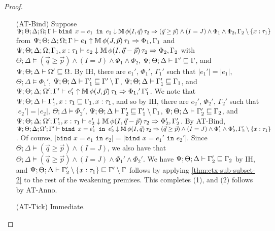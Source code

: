 \begin{proof}
\begin{itemize}
  \item[(AT-Bind)] Suppose
  $\Psi ; \Theta ; \Delta ; \Omega ; \Gamma \vdash \texttt{bind } x = e_1 \texttt{ in } e_2 \downarrow \mathbb{M} \, \phi(I,\vec{q})\, \tau_2 \Rightarrow (\vec{q} \geq \vec{p}) \wedge (I =J)  \wedge \Phi_1 \wedge \Phi_2, \Gamma_2 \setminus \{x : \tau_1\}$ from
  $\Psi ; \Theta ; \Delta ; \Omega ; \Gamma \vdash e_1 \uparrow \mathbb{M} \, \phi(J,\vec{p})\, \tau_1 \Rightarrow \Phi_1,\Gamma_1$ and
  $\Psi ; \Theta; \Delta ; \Omega ; \Gamma_1, x:\tau_1 \vdash e_2 \downarrow \mathbb{M} \, \phi(I,\vec{q} - \vec{p})\, \tau_2 \Rightarrow \Phi_2,\Gamma_2$ with
  $\Theta ; \Delta \vDash (\vec{q} \geq \vec{p}) \wedge (I =J)  \wedge \Phi_1 \wedge \Phi_2$,
  $\Psi ; \Theta ; \Delta \vdash \Gamma' \sqsubseteq \Gamma$, and
  $\Psi ; \Theta ; \Delta \vdash \Omega' \sqsubseteq \Omega$.
  By IH, there are $e_1'$, $\Phi_1'$, $\Gamma_1'$ such that
  $|e_1'| = |e_1|$,
  $\Theta ; \Delta \vDash \Phi_1'$,
  $\Psi ; \Theta ; \Delta \vdash \Gamma_1' \sqsubseteq \Gamma' \setminus \Gamma$,
  $\Psi ; \Theta ; \Delta \vdash \Gamma_1' \sqsubseteq \Gamma_1$, and
  $\Psi ; \Theta ; \Delta ; \Omega' ; \Gamma' \vdash e_1' \uparrow \mathbb{M} \, \phi(J,\vec{p}) \, \tau_1 \Rightarrow \Phi_1,'\Gamma_1'$.
  We note that $\Psi ; \Theta ; \Delta \vdash \Gamma_1',x:\tau_1 \sqsubseteq \Gamma_1, x: \tau_1$, and so
  by IH, there are $e_2'$, $\Phi_2'$, $\Gamma_2'$ such that
  $|e_2'| = |e_2|$,
  $\Theta ; \Delta \vDash \Phi_2'$,
  $\Psi ; \Theta ; \Delta \vdash \Gamma_2' \sqsubseteq \Gamma_1' \setminus \Gamma_1$,
  $\Psi ; \Theta ; \Delta \vdash \Gamma_2' \sqsubseteq \Gamma_2$, and
  $\Psi ; \Theta; \Delta ; \Omega' ; \Gamma_1', x:\tau_1 \vdash e_2' \downarrow \mathbb{M} \, \phi(I,\vec{q} - \vec{p})\, \tau_2 \Rightarrow \Phi_2',\Gamma_2'$.
  By AT-Bind,
  $\Psi ; \Theta ; \Delta ; \Omega' ; \Gamma' \vdash \texttt{bind } x = e_1' \texttt{ in } e_2' \downarrow \mathbb{M} \, \phi(I,\vec{q})\, \tau_2 \Rightarrow (\vec{q} \geq \vec{p}) \wedge (I =J)  \wedge \Phi_1' \wedge \Phi_2', \Gamma_2' \setminus \{x : \tau_1\}$.
  Of course, $|\texttt{bind } x = e_1 \texttt{ in } e_2| = |\texttt{bind } x = e_1' \texttt{ in } e_2'|$.
  Since $\Theta ; \Delta \vDash (\vec{q} \geq \vec{p}) \wedge (I=J)$, we also have that $\Theta ; \Delta \vDash (\vec{q} \geq \vec{p}) \wedge (I =J)  \wedge \Phi_1' \wedge \Phi_2'$.
  We have $\Psi ; \Theta ; \Delta \vdash \Gamma_2' \sqsubseteq \Gamma_2$  by IH, and
  $\Psi ; \Theta ; \Delta \vdash \Gamma_2' \setminus \{x : \tau_1\} \sqsubseteq \Gamma' \setminus \Gamma$ follows by applying \autoref{thm:ctx-sub-subset-2} to the rest of the weakening premises. This completes (1), and (2) follows by AT-Anno.
  
  \item[(AT-Tick)] Immediate.
  

\end{itemize}
\end{proof}
